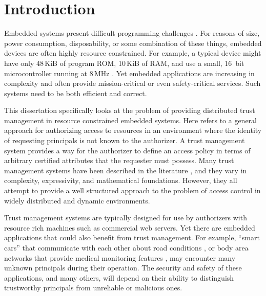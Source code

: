 \chapter{Introduction}
\label{chapter-introduction}

Embedded systems present difficult programming challenges
\cite{Mottola:2011:PWS:1922649.1922656}. For reasons of size, power consumption, disposability,
or some combination of these things, embedded devices are often highly resource constrained. For
example, a typical device might have only 48\,KiB of program ROM, 10\,KiB of RAM, and use a
small, 16~bit microcontroller running at 8\,MHz \cite{tmotesky-datasheet}. Yet embedded
applications are increasing in complexity and often provide mission-critical or even
safety-critical services. Such systems need to be both efficient and correct.

This dissertation specifically looks at the problem of providing distributed trust management in
resource constrained embedded systems. Here  refers to a general
approach for authorizing access to resources in an environment where the identity of requesting
principals is not known to the authorizer. A trust management system provides a way for the
authorizer to define an access policy in terms of arbitrary certified attributes that the
requester must possess. Many trust management systems have been described in the literature
\cite{chapin-skalka-wang-acmcs08}, and they vary in complexity, expressivity, and mathematical
foundations. However, they all attempt to provide a well structured approach to the problem of
access control in widely distributed and dynamic environments.

Trust management systems are typically designed for use by authorizers with resource rich
machines such as commercial web servers. Yet there are embedded applications that could also
benefit from trust management. For example, ``smart cars'' that communicate with each other
about road conditions \cite{Seepold:2009:ESP:1641563.1641568}, or body area networks that
provide medical monitoring features
\cite{Shnayder:2005:SNM:1098918.1098979,Chen:2011:BAN:1968858.1968873}, may encounter many
unknown principals during their operation. The security and safety of these applications, and
many others, will depend on their ability to distinguish trustworthy principals from unreliable
or malicious ones.

